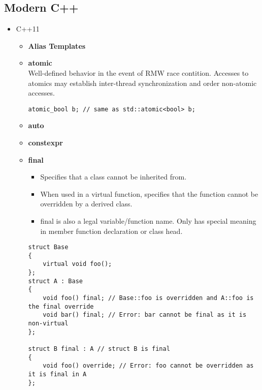 \documentclass{article}
\begin{document}
\subsection{Modern C++}
\begin{itemize}
	\item C++11
	      \begin{itemize}
		      \item \textbf{Alias Templates}
		      \item \textbf{atomic} \\
		            Well-defined behavior in the event of RMW race contition. Accesses to atomics may establish inter-thread synchronization and order non-atomic accesses.
		            \begin{lstlisting}[style=cpp]
			      atomic_bool b; // same as std::atomic<bool> b;
			      \end{lstlisting}
		      \item \textbf{auto}
		      \item \textbf{constexpr}
		      \item \textbf{final} \\
		            \begin{itemize}
			            \item Specifies that a class cannot be inherited from.
			            \item When used in a virtual function, specifies that the function cannot be overridden by a derived class.
			            \item final is also a legal variable/function name. Only has special meaning in member function declaration or class head.
		            \end{itemize}
		            \begin{lstlisting}[style=cpp]
struct Base
{
    virtual void foo();
};
struct A : Base
{
    void foo() final; // Base::foo is overridden and A::foo is the final override
    void bar() final; // Error: bar cannot be final as it is non-virtual
};
 
struct B final : A // struct B is final
{
    void foo() override; // Error: foo cannot be overridden as it is final in A
};
 

\end{lstlisting}
\end{itemize}
\end{itemize}
\end{document}
